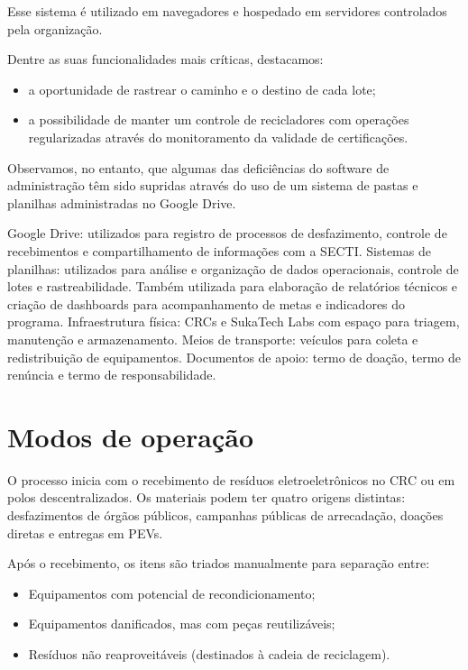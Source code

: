 \documentclass[
	12pt,				%
	openright,			%
	twoside,			%
	a4paper,			%
	english,			%
	french,				%
	spanish,			%
	brazil,				%
	]{abntex2}
\begin{document}
Esse sistema é utilizado em navegadores e hospedado em servidores controlados pela organização.



Dentre as suas funcionalidades mais críticas, destacamos:

\begin{itemize}
  \item a oportunidade de rastrear o caminho e o destino de cada lote;
  \item a possibilidade de manter um controle de recicladores com operações regularizadas através do monitoramento da validade de certificações.
\end{itemize}

Observamos, no entanto, que algumas das deficiências do software de administração têm sido supridas através do uso de um sistema de pastas e planilhas administradas no Google Drive. 

    Google Drive: utilizados para registro de processos de desfazimento, controle de recebimentos e compartilhamento de informações com a SECTI.
    Sistemas de planilhas: utilizados para análise e organização de dados operacionais, controle de lotes e rastreabilidade. Também utilizada para elaboração de relatórios técnicos e criação de dashboards para acompanhamento de metas e indicadores do programa.
    Infraestrutura física: CRCs e SukaTech Labs com espaço para triagem, manutenção e armazenamento.
    Meios de transporte: veículos para coleta e redistribuição de equipamentos.
    Documentos de apoio: termo de doação, termo de renúncia e termo de responsabilidade.


\section{Modos de operação}

O processo inicia com o recebimento de resíduos eletroeletrônicos no CRC ou em polos descentralizados. Os materiais podem ter quatro origens distintas: desfazimentos de órgãos públicos, campanhas públicas de arrecadação, doações diretas e entregas em PEVs.

Após o recebimento, os itens são triados manualmente para separação entre:

\begin{itemize}
  \item Equipamentos com potencial de recondicionamento;
  \item Equipamentos danificados, mas com peças reutilizáveis;
  \item Resíduos não reaproveitáveis (destinados à cadeia de reciclagem).
\end{itemize}
\end{document}
